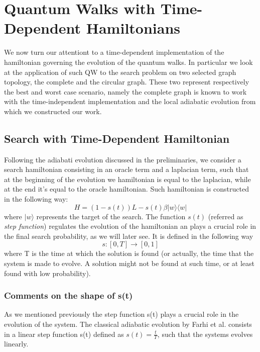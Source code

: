 \newpage
\thispagestyle{empty}
\chapter{Quantum Walks with Time-Dependent Hamiltonians}
We now turn our attentiont to a time-dependent implementation of the hamiltonian governing the evolution of the quantum walks. In particular we look at the application of such QW to the search problem on two selected graph topology, the complete and the circular graph. These two represent respectively the best and worst case scenario, namely the complete graph is known to work with the time-independent implementation \cite{Childs2004} and the local adiabatic evolution \cite{Roland2002} from which we constructed our work.

\section{Search with Time-Dependent Hamiltonian}
Following the adiabati evolution discussed in the preliminaries, we consider a search hamiltonian consisting in an oracle term and a laplacian term, such that at the beginning of the evolution we hamiltonian is equal to the laplacian, while at the end it's equal to the oracle hamiltonian. Such hamiltonian is constructed in the following way:
  \begin{equation}
    H = (1-s(t))L - s(t)\beta|w\rangle\langle w|
  \end{equation}
where $|w\rangle$ represents the target of the search.
The function $s(t)$ (referred as \textit{step function}) regulates the evolution of the hamiltonian an plays a  crucial role in the final search probability, as we will later see. It is defined in the following way
  \begin{equation}
    s: [0,T] \rightarrow [0,1]
  \end{equation}
where T is the time at which the solution is found (or actually, the time that the system is made to evolve. A solution might not be found at such time, or at least found with low probability).
\subsection{Comments on the shape of s(t)}
As we mentioned previously the step function s(t) plays a crucial role in the evolution of the system. The classical adiabatic evolution by Farhi et al. \cite{Farhi2000} consists in a linear step function s(t) defined as $s(t) = \frac{t}{T}$, such that the systems evolves linearly. \\


